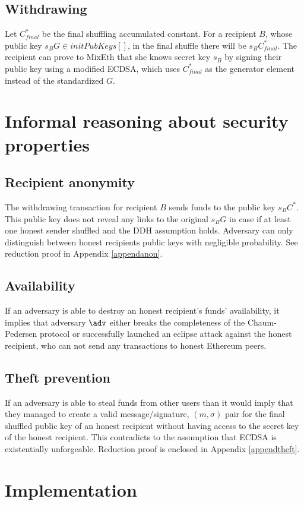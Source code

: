 \documentclass[a4paper]{article}
\theoremstyle{definition}
\begin{document}
\subsection{Withdrawing}
Let $C^*_{final}$ be the final shuffling accumulated constant. For a recipient $B$, whose public key $s_{B}G \in initPubKeys[]$, in the final shuffle there will be $s_{B}C^*_{final}$. The recipient can prove to MixEth that she knows secret key $s_{B}$ by signing their public key using a modified ECDSA, which uses $C^*_{final}$ as the generator element instead of the standardized $G$.


\section{Informal reasoning about security properties}

\subsection{Recipient anonymity}
The withdrawing transaction for recipient $B$ sends funds to the public key $s_{B}C^{*}$. This public key does not reveal any links to the original $s_{B}G$ in case if at least one honest sender shuffled and the DDH assumption holds. Adversary can only distinguish between honest recipients public keys with negligible probability. See reduction proof in Appendix \ref*{appendanon}.
\subsection{Availability}
If an adversary is able to destroy an honest recipient's funds' availability, it implies that adversary $\adv$ either breaks the completeness of the Chaum-Pedersen protocol or successfully launched an eclipse attack against the honest recipient, who can not send any transactions to honest Ethereum peers.
\subsection{Theft prevention} 
If an adversary is able to steal funds from other users than it would imply that they managed to create a valid message/signature, $(m,\sigma)$ pair for the final shuffled public key of an honest recipient without having access to the secret key of the honest recipient. This contradicts to the assumption that ECDSA is existentially unforgeable. Reduction proof is enclosed in Appendix \ref*{appendtheft}. 

\section{Implementation}
\end{document}
